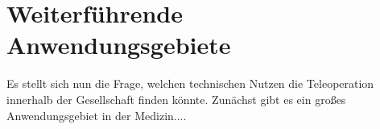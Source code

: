 \section{Weiterführende Anwendungsgebiete}
Es stellt sich nun die Frage, welchen technischen Nutzen die Teleoperation innerhalb der Gesellschaft finden könnte.
Zunächst gibt es ein großes Anwendungsgebiet in der Medizin....